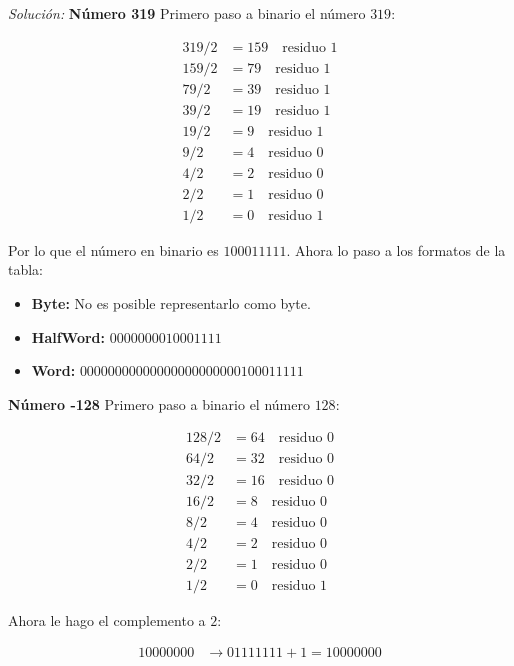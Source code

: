 \documentclass{article}
\newenvironment{solution}
    {\textit{Solución:}}
    {}
\begin{document}
\begin{solution}
\textbf{Número 319}
Primero paso a binario el número $319$:

\begin{align*}
    319/2 &= 159 \quad \text{residuo } 1\\
    159/2 &= 79 \quad \text{residuo } 1\\
    79/2 &= 39 \quad \text{residuo } 1\\
    39/2 &= 19 \quad \text{residuo } 1\\
    19/2 &= 9 \quad \text{residuo } 1\\
    9/2 &= 4 \quad \text{residuo } 0\\
    4/2 &= 2 \quad \text{residuo } 0\\
    2/2 &= 1 \quad \text{residuo } 0\\
    1/2 &= 0 \quad \text{residuo } 1
\end{align*}

Por lo que el número en binario es $100011111$. Ahora lo paso a los formatos de la tabla:

\begin{itemize}
    \item \textbf{Byte:} No es posible representarlo como byte.
    \item \textbf{HalfWord:} $0000000010001111$
    \item \textbf{Word:} $00000000000000000000000100011111$
\end{itemize}

\textbf{Número -128}
Primero paso a binario el número $128$:

\begin{align*}
    128/2 &= 64 \quad \text{residuo } 0\\
    64/2 &= 32 \quad \text{residuo } 0\\
    32/2 &= 16 \quad \text{residuo } 0\\
    16/2 &= 8 \quad \text{residuo } 0\\
    8/2 &= 4 \quad \text{residuo } 0\\
    4/2 &= 2 \quad \text{residuo } 0\\
    2/2 &= 1 \quad \text{residuo } 0\\
    1/2 &= 0 \quad \text{residuo } 1
\end{align*}

Ahora le hago el complemento a $2$:

\begin{align*}
    10000000 &\rightarrow 01111111 + 1 = 10000000
\end{align*}


\end{solution}
\end{document}
